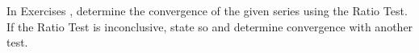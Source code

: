 {\noindent In Exercises}
{, determine the convergence of the given series using the Ratio Test. If the Ratio Test is inconclusive, state so and determine convergence with another test.
}

